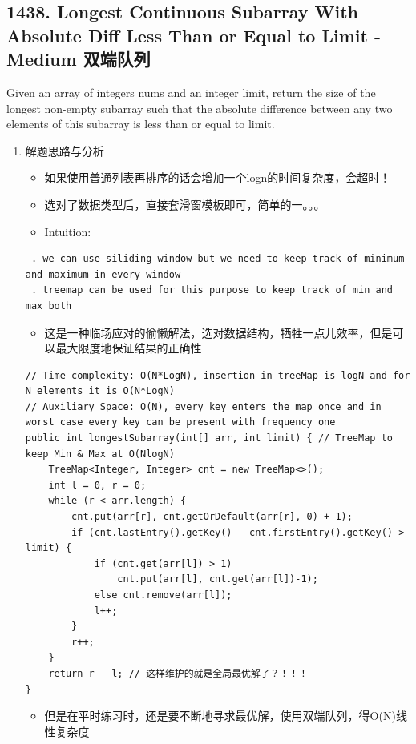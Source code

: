 \documentclass[9pt, b5paaper]{book}
\begin{document}
\subsection{1438. Longest Continuous Subarray With Absolute Diff Less Than or Equal to Limit - Medium 双端队列}
\label{sec-5-0-16}
Given an array of integers nums and an integer limit, return the size of the longest non-empty subarray such that the absolute difference between any two elements of this subarray is less than or equal to limit.
\begin{enumerate}
\item 解题思路与分析
\label{sec-5-0-16-1}
\begin{itemize}
\item 如果使用普通列表再排序的话会增加一个logn的时间复杂度，会超时！
\item 选对了数据类型后，直接套滑窗模板即可，简单的一。。。
\item Intuition:
\end{itemize}
\begin{verbatim}
 . we can use siliding window but we need to keep track of minimum and maximum in every window 
 . treemap can be used for this purpose to keep track of min and max both
\end{verbatim}
\begin{itemize}
\item 这是一种临场应对的偷懒解法，选对数据结构，牺牲一点儿效率，但是可以最大限度地保证结果的正确性
\end{itemize}
\begin{verbatim}
// Time complexity: O(N*LogN), insertion in treeMap is logN and for N elements it is O(N*LogN)
// Auxiliary Space: O(N), every key enters the map once and in worst case every key can be present with frequency one
public int longestSubarray(int[] arr, int limit) { // TreeMap to keep Min & Max at O(NlogN)
    TreeMap<Integer, Integer> cnt = new TreeMap<>();
    int l = 0, r = 0;
    while (r < arr.length) {
        cnt.put(arr[r], cnt.getOrDefault(arr[r], 0) + 1);
        if (cnt.lastEntry().getKey() - cnt.firstEntry().getKey() > limit) {
            if (cnt.get(arr[l]) > 1)
                cnt.put(arr[l], cnt.get(arr[l])-1);
            else cnt.remove(arr[l]);
            l++;
        }
        r++;
    }
    return r - l; // 这样维护的就是全局最优解了？！！！
}
\end{verbatim}
\begin{itemize}
\item 但是在平时练习时，还是要不断地寻求最优解，使用双端队列，得O(N)线性复杂度

\end{itemize}
\end{enumerate}
\end{document}
